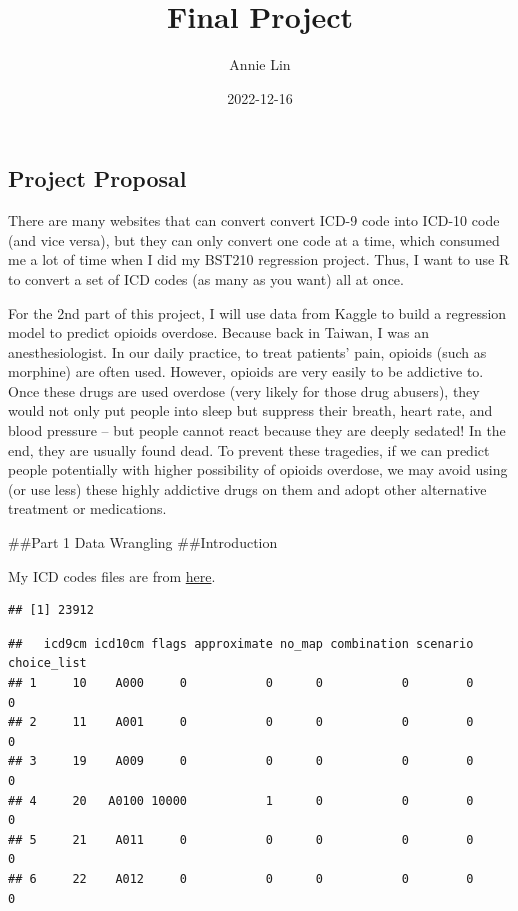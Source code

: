 \documentclass[
]{article}
\title{Final Project}
\author{Annie Lin}
\date{2022-12-16}
\begin{document}
\maketitle

\hypertarget{project-proposal}{%
\subsection{Project Proposal}\label{project-proposal}}

There are many websites that can convert convert ICD-9 code into ICD-10
code (and vice versa), but they can only convert one code at a time,
which consumed me a lot of time when I did my BST210 regression project.
Thus, I want to use R to convert a set of ICD codes (as many as you
want) all at once.

For the 2nd part of this project, I will use data from Kaggle to build a
regression model to predict opioids overdose. Because back in Taiwan, I
was an anesthesiologist. In our daily practice, to treat patients' pain,
opioids (such as morphine) are often used. However, opioids are very
easily to be addictive to. Once these drugs are used overdose (very
likely for those drug abusers), they would not only put people into
sleep but suppress their breath, heart rate, and blood pressure -- but
people cannot react because they are deeply sedated! In the end, they
are usually found dead. To prevent these tragedies, if we can predict
people potentially with higher possibility of opioids overdose, we may
avoid using (or use less) these highly addictive drugs on them and adopt
other alternative treatment or medications.

\#\#Part 1 Data Wrangling \#\#Introduction

My ICD codes files are from
\href{https://www.nber.org/research/data/icd-9-cm-and-icd-10-cm-and-icd-10-pcs-crosswalk-or-general-equivalence-mappings}{here}.

\begin{verbatim}
## [1] 23912
\end{verbatim}

\begin{verbatim}
##   icd9cm icd10cm flags approximate no_map combination scenario choice_list
## 1     10    A000     0           0      0           0        0           0
## 2     11    A001     0           0      0           0        0           0
## 3     19    A009     0           0      0           0        0           0
## 4     20   A0100 10000           1      0           0        0           0
## 5     21    A011     0           0      0           0        0           0
## 6     22    A012     0           0      0           0        0           0
\end{verbatim}
\end{document}
